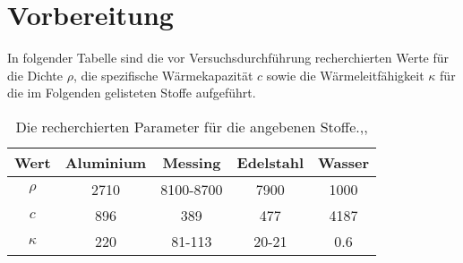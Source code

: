 \section{Vorbereitung}
\label{sec:vorbereitung}
In folgender Tabelle sind die vor Versuchsdurchführung recherchierten Werte für
die Dichte $\rho$, die spezifische Wärmekapazität $c$ sowie die Wärmeleitfähigkeit $\kappa$
für die im Folgenden gelisteten Stoffe aufgeführt.

\begin{table}[H]
  \centering
  \caption{Die recherchierten Parameter für die angebenen Stoffe.\cite{AP03},\cite{AP04},\cite{AP02}}
  \label{tab:vorbereitung}
  \begin{tabular}{S S S[table-format=8.0] S S}
    \toprule
    {Wert}  & {Aluminium} & {Messing} & {Edelstahl} & {Wasser} \\
    \midrule
    $\rho   $ & 2710     & {8100-8700}& 7900        & 1000  \\
    $c      $ & 896      & 389        & 477         & 4187  \\
    $\kappa $ & 220      & {81-113}   & {20-21}     & 0.6   \\
    \bottomrule
  \end{tabular}
\end{table}
